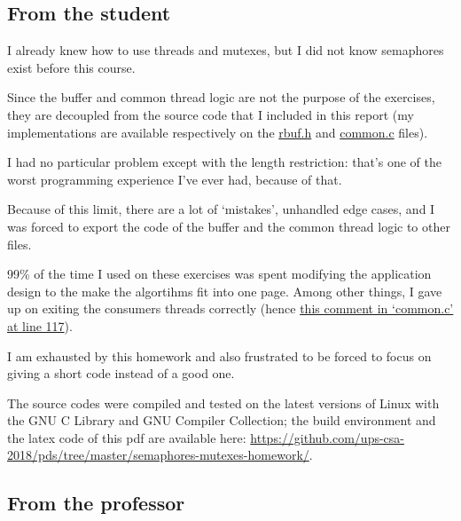 \documentclass[a4paper, 12pt]{article}
\begin{document}
\subsection{From the student}

I already knew how to use threads and mutexes, but I did not know semaphores
exist before this course.

Since the buffer and common thread logic are not the purpose of the exercises,
they are decoupled from the source code that I included in this report (my
implementations are available respectively on the
\href{https://github.com/ups-csa-2018/pds/tree/master/semaphores-mutexes-homework/rbuf.h}{rbuf.h}
and
\href{https://github.com/ups-csa-2018/pds/tree/master/semaphores-mutexes-homework/common.c}{common.c}
files).

I had no particular problem except with the length restriction: that's one of
the worst programming experience I've ever had, because of that.

Because of this limit, there are a lot of `mistakes', unhandled edge
cases, and I was forced to export the code of the buffer and the common thread
logic to other files.

99\% of the time I used on these exercises was spent modifying the application
design to the make the algortihms fit into one page. Among other things, I gave up on
exiting the consumers threads correctly (hence
\href{https://github.com/ups-csa-2018/pds/blob/master/semaphores-mutexes-homework/common.c#L117-L119}{this
comment in `common.c' at line 117}).

I am exhausted by this homework and also frustrated to be forced to focus on
giving a short code instead of a good one.

The source codes were compiled and tested on the latest versions of Linux with
the GNU C Library and GNU Compiler Collection; the build environment and the
latex code of this pdf are available here:
\url{https://github.com/ups-csa-2018/pds/tree/master/semaphores-mutexes-homework/}.

\subsection{From the professor}

\enddocument
\end{document}
